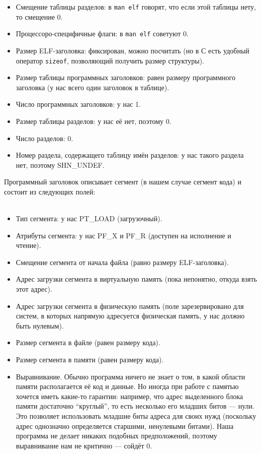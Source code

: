 \documentclass[11pt]{book}
\begin{document}
\begin{itemize}
\item Смещение таблицы разделов: в \texttt{man elf} говорят, что если этой таблицы нету, то смещение 0.
\item Процессоро-специфичные флаги: в \texttt{man elf} советуют 0.
\item Размер ELF-заголовка: фиксирован, можно посчитать (но в С есть удобный оператор \texttt{sizeof}, позволяющий получить размер структуры).
\item Размер таблицы программных заголовков: равен размеру программного заголовка (у нас всего один заголовок в таблице).
\item Число программных заголовков: у нас 1.
\item Размер таблицы разделов: у нас её нет, поэтому 0.
\item Число разделов: 0.
\item Номер раздела, содержащего таблицу имён разделов: у нас такого раздела нет, поэтому SHN\_UNDEF.
\end{itemize}
Программный заголовок описывает сегмент (в нашем случае сегмент кода) и состоит из следующих полей:
\\ \\
\begin{minipage}{0.65\textwidth}
\begin{itemize}
\item Тип сегмента: у нас PT\_LOAD (загрузочный).
\item Атрибуты сегмента: у нас PF\_X и PF\_R (доступен на исполнение и чтение).
\item Смещение сегмента от начала файла (равно размеру ELF-заголовка).
\item Адрес загрузки сегмента в виртуальную память
(пока непонятно, откуда взять этот адрес).
\item Адрес загрузки сегмента в физическую память
(поле зарезервировано для систем, в которых напрямую адресуется физическая память, у нас должно быть нулевым).
\item Размер сегмента в файле (равен размеру кода).
\item Размер сегмента в памяти (равен размеру кода).
\item Выравнивание.
Обычно программа ничего не знает о том, в какой области памяти располагается её код и данные.
Но иногда при работе с памятью хочется иметь какие-то гарантии:
например, что адрес выделенного блока памяти достаточно ``круглый'',
то есть несколько его младших битов --- нули.
Это позволяет использовать младшие биты адреса для своих нужд
(поскольку адрес однозначно определяется старшими, ненулевыми битами).
Наша программа не делает никаких подобных предположений, поэтому выравнивание нам не критично --- сойдёт 0.
\end{itemize}
\end{minipage}
\end{document}
